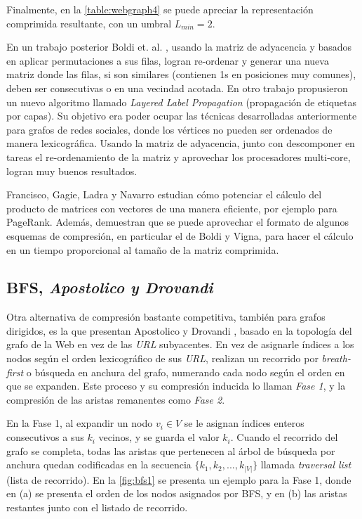 Finalmente, en la \autoref{table:webgraph4} se puede apreciar la representación comprimida resultante, con un umbral $L_{min} = 2$. 

En un trabajo posterior Boldi et. al. \cite{boldi2009permuting}, usando la matriz de adyacencia y basados en aplicar permutaciones a sus filas, logran re-ordenar y generar una nueva matriz donde las filas, si son similares (contienen 1s en posiciones muy comunes), deben ser consecutivas o en una vecindad acotada. En otro trabajo propusieron un nuevo algoritmo llamado \textit{Layered Label Propagation} \cite{boldi2011layered} (propagación de etiquetas por capas). Su objetivo era poder ocupar las técnicas desarrolladas anteriormente para grafos de redes sociales, donde los vértices no pueden ser ordenados de manera lexicográfica. Usando la matriz de adyacencia, junto con descomponer en tareas el re-ordenamiento de la matriz y aprovechar los procesadores multi-core, logran muy buenos resultados.

Francisco, Gagie, Ladra y Navarro \cite{francisco2018exploiting} estudian cómo potenciar el cálculo del producto de matrices con vectores de una manera eficiente, por ejemplo para PageRank\cite{page1999pagerank}.  Además, demuestran que se puede aprovechar el formato de algunos esquemas de compresión, en particular el de Boldi y Vigna, para hacer el cálculo en un tiempo proporcional al tamaño de la matriz comprimida.


\subsection{BFS, \textit{Apostolico y Drovandi}}
Otra alternativa de compresión bastante competitiva, también para grafos dirigidos, es la que presentan Apostolico y Drovandi \cite{apostolico2009graph}, basado en la topología del grafo de la Web en vez de las \textit{URL} subyacentes. En vez de asignarle índices a los nodos según el orden lexicográfico de sus \textit{URL}, realizan un recorrido por \textit{breath-first} o búsqueda en anchura del grafo, numerando cada nodo según el orden en que se expanden. Este proceso y su compresión inducida lo llaman \textit{Fase 1}, y la compresión de las aristas remanentes como \textit{Fase 2}.

En la Fase 1, al expandir un nodo $v_{i} \in V$ se le asignan índices enteros consecutivos a sus $k_{i}$ vecinos, y se guarda el valor $k_{i}$. Cuando el recorrido del grafo se completa, todas las aristas que pertenecen al árbol de búsqueda por anchura quedan codificadas en la secuencia $\{k_{1}, k_{2}, ..., k_{|V|}\}$ llamada \textit{traversal list} (lista de recorrido). En la \autoref{fig:bfs1} se presenta un ejemplo para la Fase 1, donde en (a) se presenta el orden de los nodos asignados por BFS, y en (b) las aristas restantes junto con el listado de recorrido.

